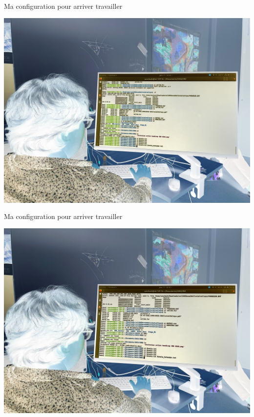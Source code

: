 \documentclass{beamer}
\begin{document}
\begin{frame}
 {Ma configuration pour arriver travailler}
 
  \includegraphics[width=1\linewidth]{images/photos/5/image3_neg.jpeg}  
 
\end{frame}

\begin{frame}
 {Ma configuration pour arriver travailler}
 
  \includegraphics[width=1\linewidth]{images/photos/5/image2_neg.jpeg}  
 
\end{frame}
\end{document}
